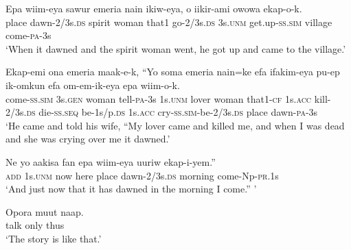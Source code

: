 \ea
\gll  Epa  wiim-eya  sawur  emeria  nain  ikiw-eya,  o  iikir-ami             owowa  ekap-o-k. \\
place  dawn-2/3s.\textsc{ds}  spirit  woman  that1  go-2/3s.\textsc{ds}  3s.\textsc{unm}  get.up-\textsc{ss}.\textsc{sim}  village  come-\textsc{pa}-3s \\


\glt ‘When it dawned and the spirit woman went, he got up and came to the village.’ \\
\z


\ea
\gll  Ekap-emi  ona  emeria  maak-e-k,  “Yo  soma  emeria  nain=ke  efa          ifakim-eya  pu-ep  ik-omkun  efa  om-em-ik-eya                       epa  wiim-o-k. \\
come-\textsc{ss}.\textsc{sim}  3s.\textsc{gen}  woman  tell-\textsc{pa}-3s  1s.\textsc{unm}  lover  woman  that1-\textsc{cf}  1s.\textsc{acc}   kill-2/3s.\textsc{ds}  die-\textsc{ss.seq}  be-1s/p.\textsc{ds}  1s.\textsc{acc}  cry-\textsc{ss}.\textsc{sim}-be-2/3s.\textsc{ds}  place  dawn-\textsc{pa}-3s \\




\glt ‘He came and told his wife, “My lover came and killed me, and when I was dead and she was crying over me it dawned.’ \\
\z


\ea
\gll  Ne  yo  aakisa  fan  epa  wiim-eya  uuriw  ekap-i-yem.” \\
\textsc{add}  1s.\textsc{unm}  now  here  place  dawn-2/3s.\textsc{ds}  morning  come-Np-\textsc{pr}.1s \\
\glt ‘And just now that it has dawned in the morning I come.” ’ \\
\z


\ea
\gll  Opora  muut  naap. \\
talk  only  thus \\
\glt ‘The story is like that.’ \\
\z


